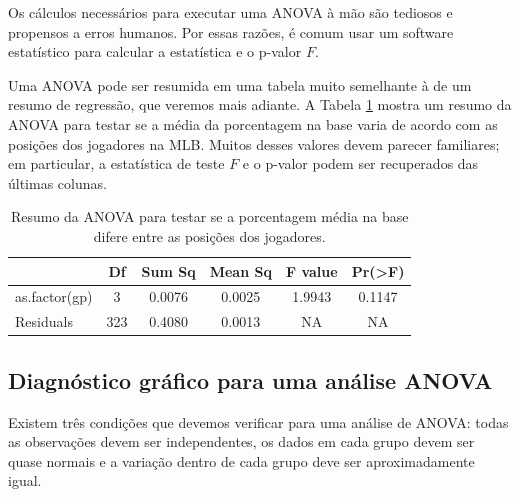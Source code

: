 \documentclass[
]{book}
\theoremstyle{definition}
\theoremstyle{definition}
\theoremstyle{definition}
\theoremstyle{definition}
\theoremstyle{remark}
\begin{document}
Os cálculos necessários para executar uma ANOVA à mão são tediosos e propensos a erros humanos. Por essas razões, é comum usar um software estatístico para calcular a estatística e o p-valor \(F\).

Uma ANOVA pode ser resumida em uma tabela muito semelhante à de um resumo de regressão, que veremos mais adiante. A Tabela \ref{tab:anovaSummaryTableForOBPAgainstPosition} mostra um resumo da ANOVA para testar se a média da porcentagem na base varia de acordo com as posições dos jogadores na MLB. Muitos desses valores devem parecer familiares; em particular, a estatística de teste \(F\) e o p-valor podem ser recuperados das últimas colunas.

\begin{table}

\caption{\label{tab:anovaSummaryTableForOBPAgainstPosition}Resumo da ANOVA para testar se a porcentagem média na base difere entre as posições dos jogadores.}
\centering
\begin{tabular}[t]{l|c|c|c|c|c}
\hline
  & Df & Sum Sq & Mean Sq & F value & Pr(>F)\\
\hline
as.factor(gp) & 3 & 0.0076 & 0.0025 & 1.9943 & 0.1147\\
\hline
Residuals & 323 & 0.4080 & 0.0013 & NA & NA\\
\hline
\end{tabular}
\end{table}

\hypertarget{graphicalDiagnosisANOVAAnalysis}{%
\subsection{Diagnóstico gráfico para uma análise ANOVA}\label{graphicalDiagnosisANOVAAnalysis}}

Existem três condições que devemos verificar para uma análise de ANOVA: todas as observações devem ser independentes, os dados em cada grupo devem ser quase normais e a variação dentro de cada grupo deve ser aproximadamente igual.
\end{document}
